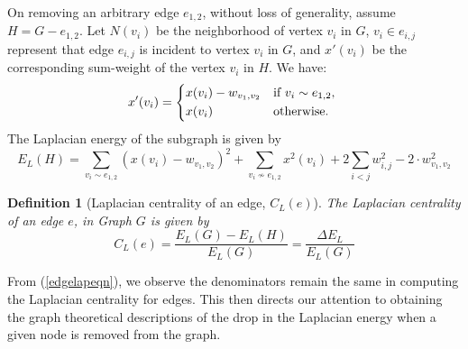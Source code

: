 \documentclass[10pt,a4paper]{article}
\newtheorem{defn}{Definition}
\begin{document}
On removing an arbitrary edge $e_{1,2}$, without loss of generality, assume $H=G- e_{1,2}$. Let $N(v_i)$ be the neighborhood of vertex $v_i$ in $G$, $v_{i} \in e_{i,j}$ represent that edge $e_{i,j}$ is incident to vertex $v_i$ in $G$, and $x'(v_i)$ be the corresponding sum-weight of the vertex $v_i$ in $H$. We have:
\begin{equation}
x'(v_i) = \begin{cases*}
x(v_i)-w_{v_{1},v_{2}} & if  $v_i \sim e_{1,2}$,  \\
x(v_i) & otherwise.
\end{cases*}
\end{equation}
The Laplacian energy of the subgraph is given by
\begin{equation}
E_L(H) = \sum_{v_i \sim e_{1,2}} (x(v_i) - w_{v_{1},v_{2}})^2 + \sum_{v_i \nsim e_{1,2}} x^2(v_i) + 2 \sum_{i<j} w^2_{i,j}- 2 \cdot w^2_{v_{1},v_{2}}
\label{edgelapH}
\end{equation}

\begin{defn}[Laplacian centrality of an edge, $C_L(e)$]
	The Laplacian centrality of an edge $e$, in Graph $G$ is given by
	\begin{equation}
	C_L(e) = \frac{E_L(G) -E_L(H)}{E_L(G)} = \frac{\Delta E_L}{E_L(G)}
	\label{edgelapeqn}
	\end{equation}
\end{defn}
From (\ref{edgelapeqn}), we observe the denominators remain the same in computing the Laplacian centrality for edges. This then directs our attention to obtaining the graph theoretical descriptions of the drop in the Laplacian energy when a given node is removed from the graph.
\end{document}
